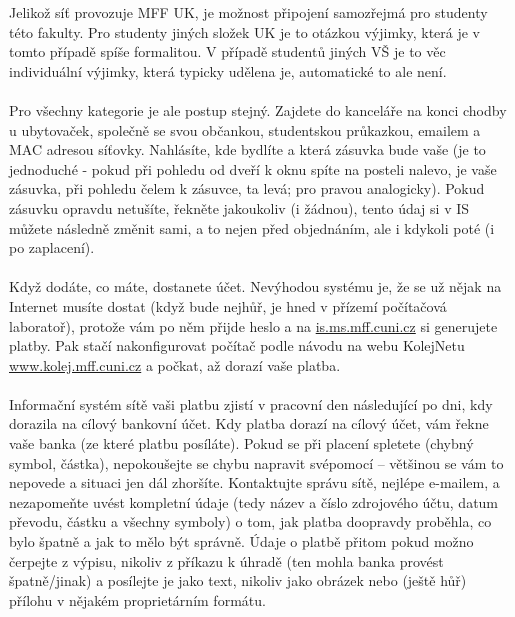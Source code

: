 Jelikož síť provozuje MFF UK, je možnost připojení samozřejmá pro studenty této
fakulty. Pro studenty jiných složek UK je to otázkou výjimky, která je v tomto
případě spíše formalitou. V případě studentů jiných VŠ je to věc individuální
výjimky, která typicky udělena je, automatické to ale není.
\\\\
Pro všechny kategorie je ale postup stejný. Zajdete do kanceláře na konci chodby
u ubytovaček, společně se svou občankou, studentskou průkazkou, emailem a MAC
adresou síťovky. Nahlásíte, kde bydlíte a která zásuvka bude vaše (je to
jednoduché - pokud při pohledu od dveří k oknu spíte na posteli nalevo, je vaše
zásuvka, při pohledu čelem k zásuvce, ta levá; pro pravou analogicky). Pokud
zásuvku opravdu netušíte, řekněte jakoukoliv (i žádnou), tento údaj si v IS
můžete následně změnit sami, a to nejen před objednáním, ale i kdykoli poté (i
po zaplacení).
\\\\
Když dodáte, co máte, dostanete účet. Nevýhodou systému je, že se už nějak na
Internet musíte dostat (když bude nejhůř, je hned v přízemí počítačová
laboratoř), protože vám po něm přijde heslo a na \url{is.ms.mff.cuni.cz} si
generujete platby. Pak stačí nakonfigurovat počítač podle návodu na webu
KolejNetu \url{www.kolej.mff.cuni.cz} a počkat, až dorazí vaše platba.
\\\\
Informační systém sítě vaši platbu zjistí v pracovní den následující po dni, kdy
dorazila na cílový bankovní účet. Kdy platba dorazí na cílový účet, vám řekne
vaše banka (ze které platbu posíláte). Pokud se při placení spletete (chybný
symbol, částka), nepokoušejte se chybu napravit svépomocí – většinou se vám to
nepovede a situaci jen dál zhoršíte. Kontaktujte správu sítě, nejlépe e-mailem,
a nezapomeňte uvést kompletní údaje (tedy název a číslo zdrojového účtu, datum
převodu, částku a všechny symboly) o tom, jak platba doopravdy proběhla, co bylo
špatně a jak to mělo být správně. Údaje o platbě přitom pokud možno čerpejte z
výpisu, nikoliv z příkazu k úhradě (ten mohla banka provést špatně/jinak) a
posílejte je jako text, nikoliv jako obrázek nebo (ještě hůř) přílohu v nějakém
proprietárním formátu.

